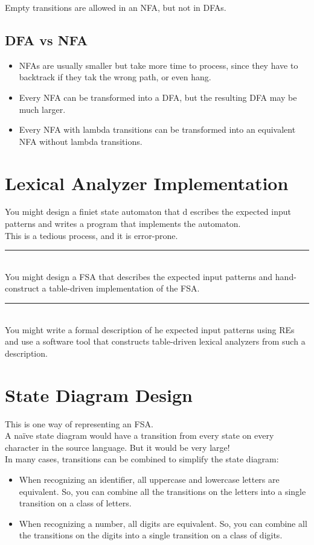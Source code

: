 Empty transitions are allowed in an NFA, but not in DFAs.


\subsection{DFA vs NFA}

\begin{itemize}
    \item NFAs are usually smaller but take more time to process, since they have to backtrack if they tak the wrong path, or even hang.
    \item Every NFA can be transformed into a DFA, but the resulting DFA may be much larger.
    \item Every NFA with lambda transitions can be transformed into an equivalent NFA without lambda transitions.
\end{itemize}

\section{Lexical Analyzer Implementation}
You might design a finiet state automaton that d escribes the expected input patterns and writes a program that implements the automaton.\\
This is a tedious process, and it is error-prone.\\
\noindent\hfil\rule{0.5\textwidth}{.4pt}\hfil
\\
You might design a FSA that describes the expected input patterns and hand-construct a table-driven implementation of the FSA.
\\
\noindent\hfil\rule{0.5\textwidth}{.4pt}\hfil
\\
You might write a formal description of he expected input patterns using REs and use a software tool that constructs table-driven lexical analyzers from such a description.

\section{State Diagram Design}
This is one way of representing an FSA.\\
A naïve state diagram would have a transition from every state on every character in the source language. But it would be very large!\\ 
In many cases, transitions can be combined to simplify the state diagram:
\begin{itemize}
     \item When recognizing an identifier, all uppercase and lowercase letters are equivalent. So, you can combine all the transitions on the letters into a single transition on a class of letters.
    \item When recognizing a number, all digits are equivalent. So, you can combine all the transitions on the digits into a single transition on a class of digits.
\end{itemize}


